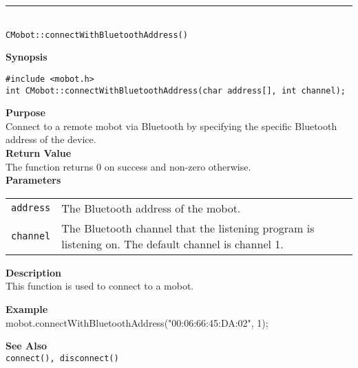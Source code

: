 \noindent
\vspace{5pt}
\rule{4.5in}{0.015in} \\
\noindent
{\LARGE \texttt{CMobot::connectWithBluetoothAddress()}}\\
{}

\noindent
{\bf Synopsis}
\vspace{-8pt}
\begin{verbatim}
#include <mobot.h>
int CMobot::connectWithBluetoothAddress(char address[], int channel);
\end{verbatim}

\noindent
{\bf Purpose}\\
Connect to a remote mobot via Bluetooth by specifying the specific Bluetooth
address of the device.\\

\noindent
{\bf Return Value}\\
The function returns 0 on success and non-zero otherwise.\\

\noindent
{\bf Parameters}
\vspace{-0.1in}
\begin{description}
\item               
\begin{tabular}{p{10 mm}p{145 mm}}
\texttt{address} & The Bluetooth address of the mobot. \\
\texttt{channel} & The Bluetooth channel that the listening program is
listening on. The default channel is channel 1. \\
\end{tabular}
\end{description}

\noindent
{\bf Description}\\
This function is used to connect to a mobot. 

\noindent
{\bf Example}\\
mobot.connectWithBluetoothAddress("00:06:66:45:DA:02", 1);
\noindent

\noindent
{\bf See Also}\\
\texttt{connect(), disconnect()}

